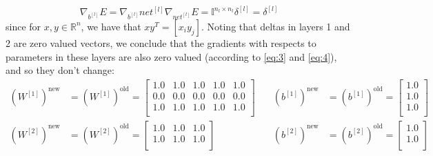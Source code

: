 \documentclass{exam}
\begin{document}
\begin{questions}
\begin{itemize}
\begin{equation}
            \end{equation}
            \begin{equation}
                \nabla_{b^{[l]}} E = \nabla_{b^{[l]}} net^{[l] }  \nabla_{net^{[l]}} E = \mathbb{I}^{n_l \times n_l} \delta^{[l]} = \delta^{[l]} \label{eq:4}
            \end{equation}
            since for $x, y \in \mathbb{R}^n$, we have that $xy^T = [x_i y_j]$. Noting that deltas in layers 1 and 2 are zero valued vectors, we conclude that the gradients with respects to parameters in these layers are also zero valued (according to \eqref{eq:3} and \eqref{eq:4}), and so they don't change:
            \begin{equation*}
                \begin{split}
                    (W^{[1]})^{\text{new}} &= (W^{[1]})^{\text{old}} = 
                    \begin{bmatrix}
                        1.0 & 1.0 & 1.0 & 1.0 & 1.0  \\
                        0.0 & 0.0 & 0.0 & 0.0 & 0.0  \\
                        1.0 & 1.0 & 1.0 & 1.0 & 1.0  \\
                    \end{bmatrix} \\
                    (W^{[2]})^{\text{new}} &= (W^{[2]})^{\text{old}} = 
                    \begin{bmatrix}
                        1.0 & 1.0 & 1.0  \\
                        1.0 & 1.0 & 1.0  \\
                    \end{bmatrix}
                \end{split} \quad
                \begin{split}
                    (b^{[1]})^{\text{new}} &= (b^{[1]})^{\text{old}} = 
                    \begin{bmatrix}
                        1.0  \\
                        1.0  \\
                        1.0  \\
                    \end{bmatrix} \\
                    (b^{[2]})^{\text{new}} &= (b^{[2]})^{\text{old}} = 
                    \begin{bmatrix}
                        1.0  \\
                        1.0  \\

\end{bmatrix}
\end{split}
\end{equation*}
\end{itemize}
\end{questions}
\end{document}
